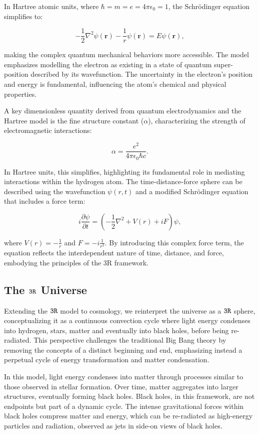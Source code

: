 \documentclass[12pt]{article}
\begin{document}
In Hartree atomic units, where \(\hbar = m = e = 4\pi\epsilon_0 = 1\), the Schrödinger equation simplifies to:

\[
    -\frac{1}{2}\nabla^2 \psi(\mathbf{r}) - \frac{1}{r}\psi(\mathbf{r}) = E\psi(\mathbf{r}),
\]

making the complex quantum mechanical behaviors more accessible. The \iR{} model emphasizes modelling the electron as existing in a state of quantum super-position described by its wavefunction. The uncertainty in the electron's position and energy is fundamental, influencing the atom's chemical and physical properties.

A key dimensionless quantity derived from quantum electrodynamics and the Hartree model is the fine structure constant (\(\alpha\)), characterizing the strength of electromagnetic interactions:

\[
    \alpha = \frac{e^2}{4\pi \epsilon_0 \hbar c}.
\]

In Hartree units, this simplifies, highlighting its fundamental role in mediating interactions within the hydrogen atom. The time-distance-force sphere can be described using the wavefunction \(\psi(r, t)\) and a modified Schrödinger equation that includes a force term:

\[
    i \frac{\partial \psi}{\partial t} = \left( -\frac{1}{2} \nabla^2 + V(r) + iF \right) \psi,
\]

where \(V(r) = -\frac{1}{r}\) and \(F = -i \frac{1}{r^2}\). By introducing this complex force term, the equation reflects the interdependent nature of time, distance, and force, embodying the principles of the 3R framework.

\subsection*{The \(\texttt{3R}\) Universe}

Extending the \(\texttt{3R}\) model to cosmology, we reinterpret the universe as a \(\texttt{3R}\) sphere, conceptualizing it as a continuous convection cycle where light energy condenses into hydrogen, stars, matter and eventually into black holes, before being re-radiated. This perspective challenges the traditional Big Bang theory by removing the concepts of a distinct beginning and end, emphasizing instead a perpetual cycle of energy transformation and matter condensation.

In this model, light energy condenses into matter through processes similar to those observed in stellar formation. Over time, matter aggregates into larger structures, eventually forming black holes. Black holes, in this framework, are not endpoints but part of a dynamic cycle. The intense gravitational forces within black holes compress matter and energy, which can be re-radiated as high-energy particles and radiation, observed as jets in side-on views of black holes.
\end{document}
